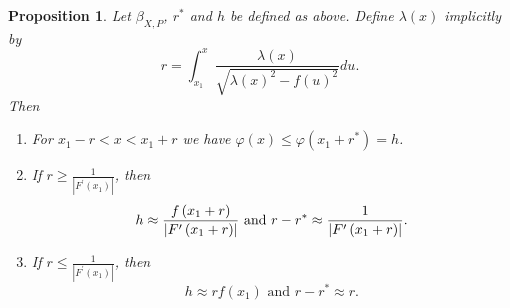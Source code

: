 \documentclass{amsart}
\theoremstyle{plain}
\newtheorem{proposition}[theorem]{Proposition}
\numberwithin{equation}{section}
\begin{document}
\begin{proposition}
	\label{height}Let $\beta _{X,P}$, $r^{\ast }$ and $h$ be defined as above.
	Define $\lambda \left( x\right) $ implicitly by%
	\begin{equation*}
	r=\int_{x_{1}}^{x}\frac{\lambda \left( x\right) }{\sqrt{\lambda \left(
			x\right) ^{2}-f\left( u\right) ^{2}}}du.
	\end{equation*}%
	Then
	
	\begin{enumerate}
		\item For $x_{1}-r<x<x_{1}+r$ we have $\varphi \left( x\right) \leq \varphi
		\left( x_{1}+r^{\ast }\right) =h$.
		
		\item If $r\geq \frac{1}{\left\vert F^{\prime }\left( x_{1}\right)
			\right\vert }$, then 
		\begin{equation*}
		h\approx \frac{f\left( x_{1}+r\right) }{\left\vert F^{\prime }\left(
			x_{1}+r\right) \right\vert }\text{ and }r-r^{\ast }\approx \frac{1}{%
			\left\vert F^{\prime }\left( x_{1}+r\right) \right\vert }.
		\end{equation*}
		
		\item If $r\leq \frac{1}{\left\vert F^{\prime }\left( x_{1}\right)
			\right\vert }$, then%
		\begin{equation*}
		h\approx rf\left( x_{1}\right) \text{ and }r-r^{\ast }\approx r.
		\end{equation*}
	\end{enumerate}
\end{proposition}
\end{document}
